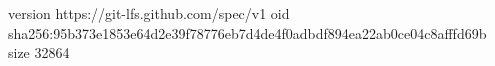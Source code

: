 version https://git-lfs.github.com/spec/v1
oid sha256:95b373e1853e64d2e39f78776eb7d4de4f0adbdf894ea22ab0ce04c8afffd69b
size 32864
